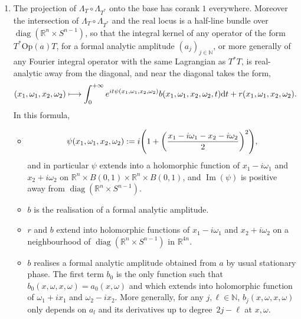 \documentclass[10pt]{amsart}
\theoremstyle{definition}\newtheorem{defi}[theo]{Definition}\newtheorem{rema}[theo]{Remark}\newtheorem{exam}[theo]{Example}\newtheorem{exem}[theo]{Example}\newtheorem{nota}[theo]{Notation}
\DeclareMathOperator{\diag}{diag}
\DeclareMathOperator{\im}{Im}
\newcommand{\Opp}{\mathrm{Op}}
\newcommand\1{\mathds{1}}
\newcommand{\R}{\mathbb{R}}
\newcommand{\N}{\mathbb{N}}
\newcommand{\dd}{\mathrm{d}}
\let\oldmapsto\mapsto
\renewcommand*{\mapsto}{\mathchoice{\longmapsto}{\oldmapsto}{\oldmapsto}{\oldmapsto}}
\let\originalleft\left
\let\originalright\right
\renewcommand{\left}{\mathopen{}\mathclose\bgroup\originalleft}
\renewcommand{\right}{\aftergroup\egroup\originalright}
\begin{document}
\begin{prop}
\begin{enumerate}
\item\label{prop4.19.3} The projection of $\Lambda_{T}\circ\Lambda_{T^*}$ onto the base has corank $1$ everywhere. Moreover the intersection of $\Lambda_{T}\circ\Lambda_{T^*}$ and the real locus is a half-line bundle over $\diag(\R^{n}\times S^{n-1})$, so that the integral kernel of any operator of the form $T^*\Opp(a)T$, for a formal analytic amplitude $(a_j)_{j\in \N}$, or more generally of any Fourier integral operator with the same Lagrangian as $T^*T$, is real-analytic away from the diagonal, and near the diagonal takes the form,
\[
(x_1,\omega_1,x_2,\omega_2)\mapsto
\int_0^{+\infty}e^{it\psi(x_1,\omega_1,x_2,\omega_2)}b(x_1,\omega_1,x_2,\omega_2,t)\dd t+r(x_1,\omega_1,x_2,\omega_2).
\]
In this formula,
\begin{itemize}
\item
\begin{equation}\label{eq:phase_Toep}
\psi(x_1,\omega_1,x_2,\omega_2):=i\left(1+\left(\frac{x_1-i\omega_1-x_2-i\omega_2}{2}\right)^2\right),
\end{equation}
and in particular $\psi$ extends into a holomorphic function of $x_1-i\omega_1$ and $x_2+i\omega_2$ on $\R^n\times B(0,1)\times
\R^n\times B(0,1)$, and $\im(\psi)$ is positive away from $\diag(\R^n\times S^{n-1})$.
\item $b$ is the realisation of a formal analytic amplitude.
\item $r$ and $b$ extend into holomorphic functions of $x_1-i\omega_1$ and $x_2+i\omega_2$ on a neighbourhood of $\diag(\R^n\times S^{n-1})$ in $\R^{4n}$.
\item $b$ realises a formal analytic amplitude obtained from $a$ by usual stationary phase. The first term $b_0$ is the only function such that $b_0(x,\omega,x,\omega)=a_0(x,\omega)$ and which extends into holomorphic function of $\omega_1+ix_1$ and $\omega_2-ix_2$. More generally, for any $j,\ell\in \N$, $b_j(x,\omega,x,\omega)$ only depends on $a_l$ and its derivatives up to degree~$2j-\ell$ at $x,\omega$.
\end{itemize}
\end{enumerate}
\end{prop}
\end{document}
